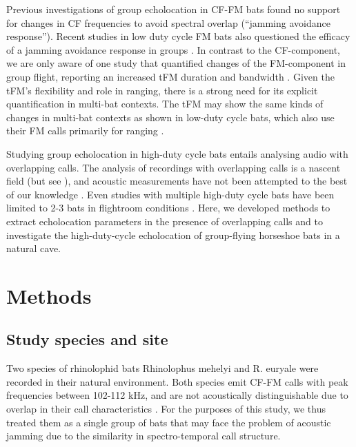 \documentclass[
]{book}
\begin{document}
Previous investigations of group echolocation in CF-FM bats found no support for changes in CF frequencies to avoid spectral overlap (``jamming avoidance response'')\citep{jones1993echolocation, jones1994individual, fawcett2015echolocation}. Recent studies in low duty cycle FM bats also questioned the efficacy of a jamming avoidance response in groups \citep{gotze2016no, cvikel2015b, mazar2020sensorimotor}. In contrast to the CF-component, we are only aware of one study that quantified changes of the FM-component in group flight, reporting an increased tFM duration and bandwidth \citep{fawcett2015echolocation}. Given the tFM's flexibility and role in ranging, there is a strong need for its explicit quantification in multi-bat contexts. The tFM may show the same kinds of changes in multi-bat contexts as shown in low-duty cycle bats, which also use their FM calls primarily for ranging \citep{fawcett2015clutter, amichai2015calling, hase2018bats}.

Studying group echolocation in high-duty cycle bats entails analysing audio with overlapping calls. The analysis of recordings with overlapping calls is a nascent field (but see \citet{izadi2019segmentation}), and acoustic measurements have not been attempted to the best of our knowledge . Even studies with multiple high-duty cycle bats have been limited to 2-3 bats in flightroom conditions \citep{fawcett2015echolocation, jones1993echolocation, jones1994individual}. Here, we developed methods to extract echolocation parameters in the presence of overlapping calls and to investigate the high-duty-cycle echolocation of group-flying horseshoe bats in a natural cave.

\hypertarget{methods}{%
\section{Methods}\label{methods}}

\hypertarget{study-species-and-site}{%
\subsection{Study species and site}\label{study-species-and-site}}

Two species of rhinolophid bats Rhinolophus mehelyi and R. euryale were recorded in their natural environment. Both species emit CF-FM calls with peak frequencies between 102-112 kHz, and are not acoustically distinguishable due to overlap in their call characteristics \citep{dietz2016bats}. For the purposes of this study, we thus treated them as a single group of bats that may face the problem of acoustic jamming due to the similarity in spectro-temporal call structure.
\end{document}

